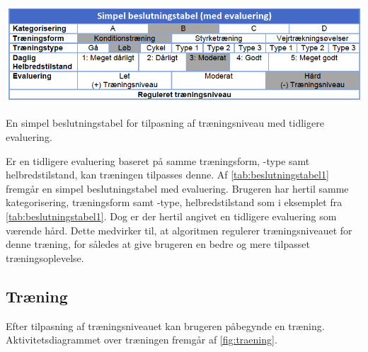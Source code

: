 \begin{table}[H]
\centering
\includegraphics[width=1\textwidth]{figures/aktivitetsdiagram/beslutningstabel1}
\caption{En simpel beslutningstabel for tilpasning af træningsniveau med tidligere evaluering.}
\label{tab:beslutningstabel1}
\end{table} 

Er en tidligere evaluering baseret på samme træningsform, -type samt helbredstilstand, kan træningen tilpasses denne. Af \autoref{tab:beslutningstabel1} fremgår en simpel beslutningstabel med evaluering. Brugeren har hertil samme kategorisering, træningsform samt -type, helbredstilstand som i eksemplet fra \autoref{tab:beslutningstabel1}. Dog er der hertil angivet en tidligere evaluering som værende hård. Dette medvirker til, at algoritmen regulerer træningsniveauet for denne træning, for således at give brugeren en bedre og mere tilpasset træningsoplevelse.


\subsection*{Træning} \label{sec:traening}
Efter tilpasning af træningsniveauet kan brugeren påbegynde en træning. Aktivitetsdiagrammet over træningen fremgår af \autoref{fig:traening}. 

